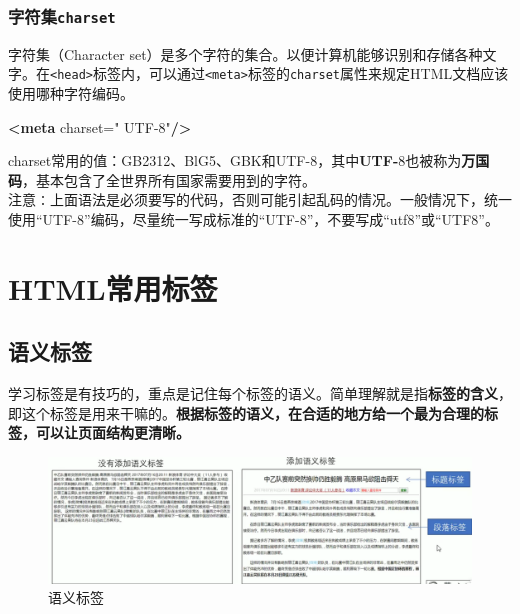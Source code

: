 \documentclass[
]{book}
\newenvironment{Shaded}{\begin{snugshade}}{\end{snugshade}}
\newcommand{\KeywordTok}[1]{\textcolor[rgb]{0.13,0.29,0.53}{\textbf{#1}}}
\newcommand{\OtherTok}[1]{\textcolor[rgb]{0.56,0.35,0.01}{#1}}
\newcommand{\StringTok}[1]{\textcolor[rgb]{0.31,0.60,0.02}{#1}}
\begin{document}
\hypertarget{ux5b57ux7b26ux96c6charset}{%
\subsection{\texorpdfstring{字符集\texttt{charset}}{字符集charset}}\label{ux5b57ux7b26ux96c6charset}}

字符集（Character set）是多个字符的集合。以便计算机能够识别和存储各种文字。在\texttt{\textless{}head\textgreater{}}标签内，可以通过\texttt{\textless{}meta\textgreater{}}标签的\texttt{charset}属性来规定HTML文档应该使用哪种字符编码。

\begin{Shaded}
\begin{Highlighting}[]
\KeywordTok{\textless{}meta}\OtherTok{ charset=}\StringTok{" UTF{-}8"}\KeywordTok{/\textgreater{}}
\end{Highlighting}
\end{Shaded}

charset常用的值：GB2312、BlG5、GBK和UTF-8，其中\textbf{UTF-}8也被称为\textbf{万国码}，基本包含了全世界所有国家需要用到的字符。\\
注意∶上面语法是必须要写的代码，否则可能引起乱码的情况。一般情况下，统一使用``UTF-8''编码，尽量统一写成标准的``UTF-8''，不要写成``utf8''或``UTF8''。

\hypertarget{htmlux5e38ux7528ux6807ux7b7e}{%
\chapter{HTML常用标签}\label{htmlux5e38ux7528ux6807ux7b7e}}

\hypertarget{ux8bedux4e49ux6807ux7b7e}{%
\section{语义标签}\label{ux8bedux4e49ux6807ux7b7e}}

学习标签是有技巧的，重点是记住每个标签的语义。简单理解就是指\textbf{标签的含义}，即这个标签是用来干嘛的。\textbf{根据标签的语义，在合适的地方给一个最为合理的标签，可以让页面结构更清晰。}

\begin{figure}

{\centering \includegraphics{fig/1-6} 

}

\caption{语义标签}\label{fig:unnamed-chunk-1}
\end{figure}
\end{document}
